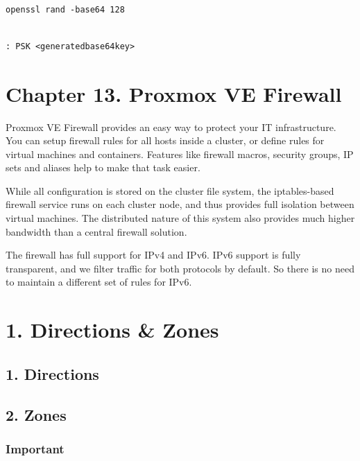 \begin{lstlisting}

openssl rand -base64 128

\end{lstlisting}

\begin{lstlisting}

: PSK <generatedbase64key>

\end{lstlisting}


\section{Chapter 13. Proxmox VE Firewall}

Proxmox VE Firewall provides an easy way to protect your IT infrastructure. You can setup firewall rules for all hosts inside a cluster, or define rules for virtual machines and containers. Features like firewall macros, security groups, IP sets and aliases help to make that task easier.

While all configuration is stored on the cluster file system, the iptables-based firewall service runs on each cluster node, and thus provides full isolation between virtual machines. The distributed nature of this system also provides much higher bandwidth than a central firewall solution.

The firewall has full support for IPv4 and IPv6. IPv6 support is fully transparent, and we filter traffic for both protocols by default. So there is no need to maintain a different set of rules for IPv6.


\section{1. Directions & Zones}

\subsection{1. Directions}

\subsection{2. Zones}

\subsubsection{Important}


